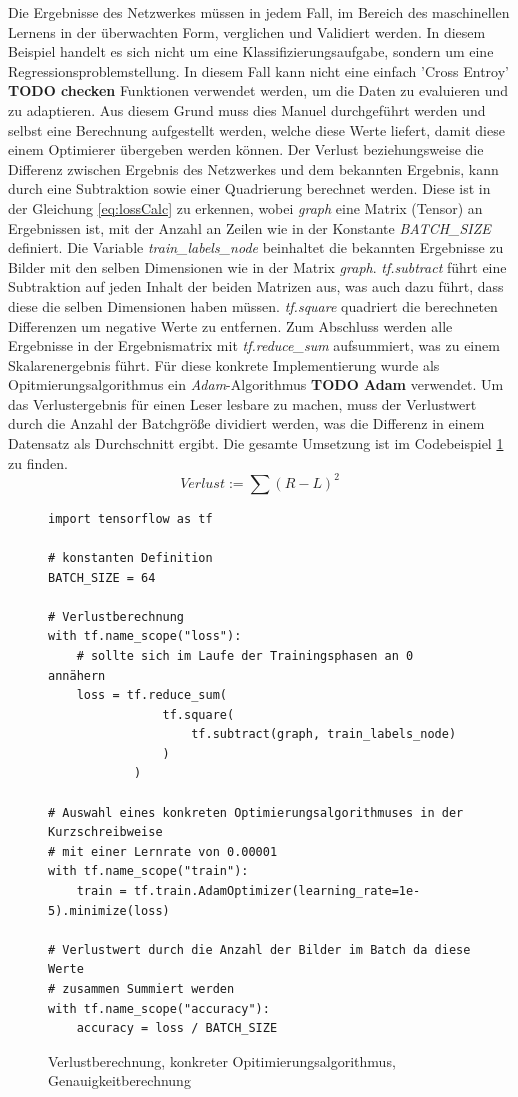 Die Ergebnisse des Netzwerkes müssen in jedem Fall, im Bereich des maschinellen Lernens in der überwachten Form, verglichen und Validiert werden. 
In diesem Beispiel handelt es sich nicht um eine Klassifizierungsaufgabe, sondern um eine Regressionsproblemstellung. 
In diesem Fall kann nicht eine einfach 'Cross Entroy' \textbf{TODO checken} Funktionen verwendet werden, um die Daten zu evaluieren und zu adaptieren. 
Aus diesem Grund muss dies Manuel durchgeführt werden und selbst eine Berechnung aufgestellt werden, welche diese Werte liefert, damit diese einem Optimierer übergeben werden können. 
Der Verlust beziehungsweise die Differenz zwischen Ergebnis des Netzwerkes und dem bekannten Ergebnis, kann durch eine Subtraktion sowie einer Quadrierung berechnet werden. 
Diese ist in der Gleichung \ref{eq:lossCalc} zu erkennen, wobei \textit{graph} eine Matrix (Tensor) an Ergebnissen ist, mit der Anzahl an Zeilen wie in der Konstante \textit{BATCH\_SIZE} definiert. 
Die Variable \textit{train\_labels\_node} beinhaltet die bekannten Ergebnisse zu Bilder mit den selben Dimensionen wie in der Matrix \textit{graph}. 
\textit{tf.subtract} führt eine Subtraktion auf jeden Inhalt der beiden Matrizen aus, was auch dazu führt, dass diese die selben Dimensionen haben müssen. 
\textit{tf.square} quadriert die berechneten Differenzen um negative Werte zu entfernen. 
Zum Abschluss werden alle Ergebnisse in der Ergebnismatrix mit \textit{tf.reduce\_sum} aufsummiert, was zu einem Skalarenergebnis führt. 
Für diese konkrete Implementierung wurde als Opitmierungsalgorithmus ein \textit{Adam}-Algorithmus \textbf{TODO Adam} verwendet. 
Um das Verlustergebnis für einen Leser lesbare zu machen, muss der Verlustwert durch die Anzahl der Batchgröße dividiert werden, was die Differenz in einem Datensatz als Durchschnitt ergibt. 
Die gesamte Umsetzung ist im Codebeispiel \ref{fig:VerlustKonkreOpitimier} zu finden. 
\begin{equation}
	Verlust := \sum{(R - L)^2}
	\label{eq:lossCalc}
\end{equation}
\begin{figure}[ht!]
\lstset{language=Python}
\begin{lstlisting}
import tensorflow as tf

# konstanten Definition
BATCH_SIZE = 64

# Verlustberechnung
with tf.name_scope("loss"):
    # sollte sich im Laufe der Trainingsphasen an 0 annähern
    loss = tf.reduce_sum(
    			tf.square(
    				tf.subtract(graph, train_labels_node)
    			)
    		)

# Auswahl eines konkreten Optimierungsalgorithmuses in der Kurzschreibweise
# mit einer Lernrate von 0.00001
with tf.name_scope("train"):
    train = tf.train.AdamOptimizer(learning_rate=1e-5).minimize(loss)
    
# Verlustwert durch die Anzahl der Bilder im Batch da diese Werte 
# zusammen Summiert werden
with tf.name_scope("accuracy"):    
    accuracy = loss / BATCH_SIZE
\end{lstlisting}
	\caption{Verlustberechnung, konkreter Opitimierungsalgorithmus, Genauigkeitberechnung}
	\label{fig:VerlustKonkreOpitimier}
\end{figure}
 
